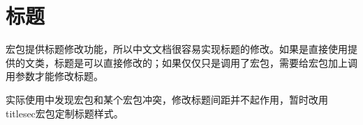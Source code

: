 \begin{latex}
\color{keyword}{\slshape function, return, if, true, false}
\end{latex}

\section{标题}

\CTeX 宏包提供标题修改功能，所以中文文档很容易实现标题的修改。如果是直接使用\CTeX 提供的文类，标题是可以直接修改的；如果仅仅只是调用了\CTeX 宏包，需要给宏包加上调用参数才能修改标题。

\begin{latex}
\usepackage[
    heading=true,%
]{ctex}
\end{latex}

实际使用中发现\CTeX{}宏包和某个宏包冲突，修改标题间距并不起作用，暂时改用titlesec宏包定制标题样式。



